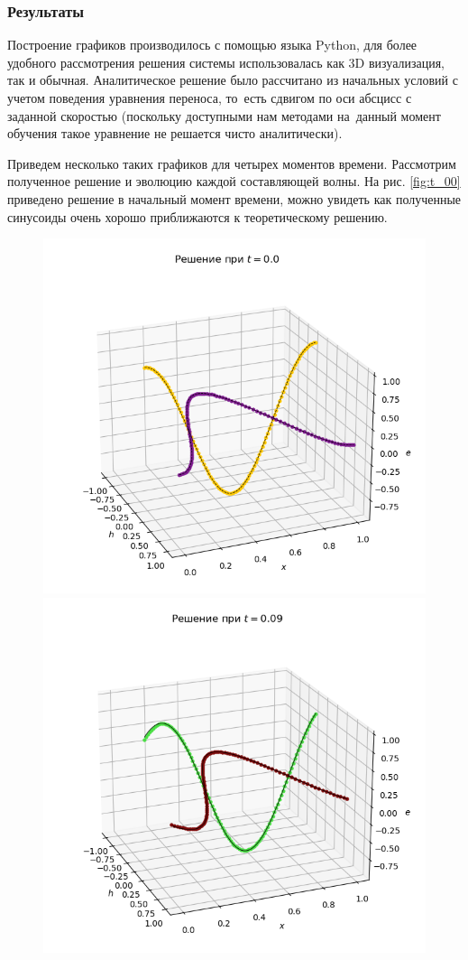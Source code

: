 \documentclass[12pt,a4paper]{article}
\begin{document}
	\subsubsection{Результаты}
	Построение графиков производилось с помощью языка Python, для более удобного рассмотрения решения системы использовалась как 3D визуализация, так и обычная. Аналитическое решение было рассчитано из начальных условий с учетом поведения уравнения переноса, то~есть сдвигом по оси абсцисс с заданной скоростью (поскольку доступными нам методами на~данный момент обучения такое уравнение не решается чисто аналитически).
	
	Приведем несколько таких графиков для четырех моментов времени. Рассмотрим полученное решение и эволюцию каждой составляющей волны. На рис. \ref{fig:t_00} приведено решение в начальный момент времени, можно увидеть как полученные синусоиды очень хорошо приближаются к теоретическому решению.
	\begin{figure}[!h]
		\centering
		\includegraphics[width=0.45\linewidth]{figures/addd/Figure_1_t00_eh.png}
		\hspace{1em}
		\includegraphics[width=0.45\linewidth]{figures/addd/Figure_2_t09_eh.png}
	\end{figure}
\end{document}

